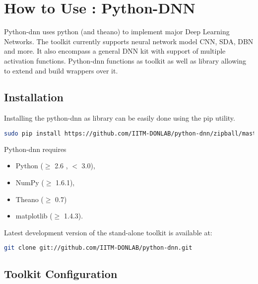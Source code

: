 \appendix
\label{app:pydnn}
\chapter{How to Use : Python-DNN}
Python-dnn uses python (and theano) to implement major Deep Learning Networks.  The toolkit currently supports neural network model CNN, SDA, DBN and more.  It also encompass a  general DNN  kit with support of multiple activation functions.  Python-dnn functions as toolkit as well as library allowing to extend and build wrappers over it.
\section{Installation}
Installing  the python-dnn as library can be easily done using the pip utility.
\begin{lstlisting}[language=bash,basicstyle=\small] 
sudo pip install https://github.com/IITM-DONLAB/python-dnn/zipball/master
\end{lstlisting}
Python-dnn requires 
\begin{itemize}
	\item Python ($\geq$ 2.6 , $<$ 3.0),
	\item NumPy ($\geq$ 1.6.1),
	\item Theano ($\geq$ 0.7)
	\item matplotlib ($\geq$ 1.4.3).
\end{itemize}
\noindent Latest development version of the stand-alone toolkit is available at:
\begin{lstlisting}[language=bash,basicstyle=\small] 
git clone git://github.com/IITM-DONLAB/python-dnn.git
\end{lstlisting}

\section{Toolkit Configuration} 
